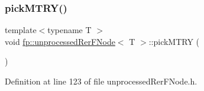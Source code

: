 \mbox{\label{classfp_1_1unprocessedRerFNode_af4593ac3feb0551307f5a863e109dd30}} 
\subsubsection{\texorpdfstring{pick\+M\+T\+R\+Y()}{pickMTRY()}}
{\footnotesize\ttfamily template$<$typename T $>$ \\
void \hyperlink{classfp_1_1unprocessedRerFNode}{fp\+::unprocessed\+Rer\+F\+Node}$<$ T $>$\+::pick\+M\+T\+RY (\begin{DoxyParamCaption}{ }\end{DoxyParamCaption})\hspace{0.3cm}{\ttfamily [inline]}}



Definition at line 123 of file unprocessed\+Rer\+F\+Node.\+h.


